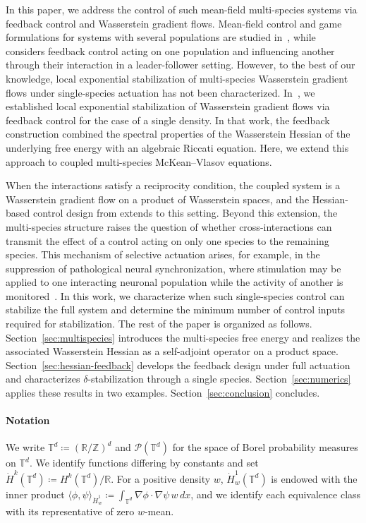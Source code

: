\documentclass[letterpaper, 10pt, conference]{ieeeconf}
\newcommand{\R}{\mathbb{R}}
\newcommand{\T}{\mathbb{T}}
\newcommand{\Pcal}{\mathcal{P}}
\newcommand{\dotHk}[1][k]{\dot{H}^{#1}}
\begin{document}
In this paper, we address the control of such mean-field multi-species systems via feedback control and Wasserstein gradient flows. 
Mean-field control and game formulations for systems with several populations are studied in~\cite{BensoussanHuangLauriere2018}, while~\cite{AlbiKalise2018} considers feedback control acting on one population and influencing another through their interaction in a leader-follower setting. 
However, to the best of our knowledge, local exponential stabilization of multi-species Wasserstein gradient flows under single-species actuation has not been characterized. In~\cite{KaliseMoschenPavliotis2026}, we established local exponential stabilization of Wasserstein gradient flows via feedback control for the case of a single density.
In that work, the feedback construction combined the spectral properties of the Wasserstein Hessian of the underlying free energy with an algebraic Riccati equation.
Here, we extend this approach to coupled multi-species McKean--Vlasov equations.

When the interactions satisfy a reciprocity condition, the coupled system is a Wasserstein gradient flow on a product of Wasserstein spaces, and the Hessian-based control design from \cite{KaliseMoschenPavliotis2026} extends to this setting.
Beyond this extension, the multi-species structure raises the question of whether cross-interactions can transmit the effect of a control acting on only one species to the remaining species.
This mechanism of selective actuation arises, for example, in the suppression of pathological neural synchronization, where stimulation may be applied to one interacting neuronal population while the activity of another is monitored~\cite{TukhlinaRosenblum2008}.
In this work, we characterize when such single-species control can stabilize the full system and determine the minimum number of control inputs required for stabilization.
The rest of the paper is organized as follows.
Section~\ref{sec:multispecies} introduces the multi-species free energy and realizes the associated Wasserstein Hessian as a self-adjoint operator on a product space.
Section~\ref{sec:hessian-feedback} develops the feedback design under full actuation and characterizes $\delta$-stabilization through a single species.
Section~\ref{sec:numerics} applies these results in two examples.
Section~\ref{sec:conclusion} concludes.

\paragraph*{Notation}
We write $\T^d \coloneqq (\R/\mathbb{Z})^d$ and $\Pcal(\T^d)$ for the space of Borel probability measures on $\T^d$.
We identify functions differing by constants and set $\dotHk[k](\T^d) \coloneqq H^k(\T^d)/\R$.
For a positive density $w$, $\dotHk[1]_w(\T^d)$ is endowed with the inner product $\langle\phi, \psi\rangle_{\dotHk[1]_w} \coloneqq \int_{\T^d} \nabla\phi \cdot \nabla\psi \, w \, dx$, and we identify each equivalence class with its representative of zero $w$-mean.
\end{document}
